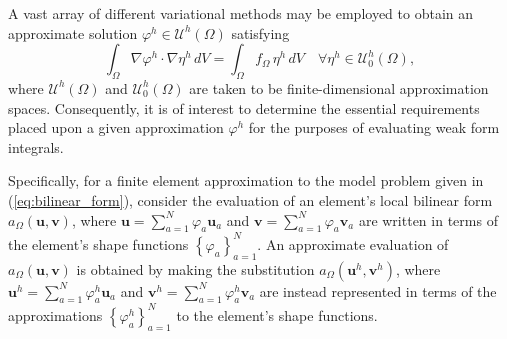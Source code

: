 	A vast array of different variational methods may be employed to obtain an approximate solution $\varphi^h \in \mathcal{U}^h (\Omega)$ satisfying
	\begin{equation}
		\int_\Omega \nabla \varphi^h \cdot \nabla \eta^h \, dV = \int_\Omega f_{\Omega} \, \eta^h \, dV \quad \forall \eta^h \in \mathcal{U}^h_0 (\Omega),
		\label{eq:approximate_bvp}
	\end{equation}
	where $\mathcal{U}^h (\Omega)$ and $\mathcal{U}^h_0 (\Omega)$ are taken to be finite-dimensional approximation spaces. Consequently, it is of interest to determine the essential requirements placed upon a given approximation $\varphi^h$ for the purposes of evaluating weak form integrals.
	
	Specifically, for a finite element approximation to the model problem given in (\ref{eq:bilinear_form}), consider the evaluation of an element's local bilinear form $a_{\Omega}(\mathbf{u},\mathbf{v})$, where $\mathbf{u} = \sum_{a=1}^N \varphi_a \mathbf{u}_a$ and $\mathbf{v} = \sum_{a=1}^N \varphi_a \mathbf{v}_a$ are written in terms of the element's shape functions $\left\{ \varphi_a \right\}_{a=1}^N$. An approximate evaluation of $a_{\Omega}(\mathbf{u},\mathbf{v})$ is obtained by making the substitution $a_{\Omega}(\mathbf{u}^h,\mathbf{v}^h)$, where $\mathbf{u}^h = \sum_{a=1}^N \varphi^h_a \mathbf{u}_a$ and $\mathbf{v}^h = \sum_{a=1}^N \varphi^h_a \mathbf{v}_a$ are instead represented in terms of the approximations $\left\{ \varphi^h_a \right\}_{a=1}^N$ to the element's shape functions.
	
